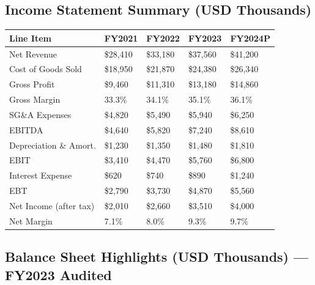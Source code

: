 \documentclass[11pt,a4paper]{article}
\begin{document}
\subsection{Income Statement Summary (USD Thousands)}

\renewcommand{\arraystretch}{1.35}
\begin{tabularx}{\textwidth}{@{} L{4.5cm} R{2.0cm} R{2.0cm} R{2.0cm} R{2.4cm} @{}}
  \toprule
  {\color{white}\bfseries\small Line Item} &
  {\color{white}\bfseries\small FY2021} &
  {\color{white}\bfseries\small FY2022} &
  {\color{white}\bfseries\small FY2023} &
  {\color{white}\bfseries\small FY2024P} \\
  \midrule
  Net Revenue                & \$28,410  & \$33,180  & \$37,560  & \$41,200  \\
  Cost of Goods Sold         & \$18,950  & \$21,870  & \$24,380  & \$26,340  \\
  Gross Profit               & \$9,460   & \$11,310  & \$13,180  & \$14,860  \\
  Gross Margin               & 33.3\%    & 34.1\%    & 35.1\%    & 36.1\%    \\
  SG\&A Expenses             & \$4,820   & \$5,490   & \$5,940   & \$6,250   \\
  EBITDA                     & \$4,640   & \$5,820   & \$7,240   & \$8,610   \\
  Depreciation \& Amort.     & \$1,230   & \$1,350   & \$1,480   & \$1,810   \\
  EBIT                       & \$3,410   & \$4,470   & \$5,760   & \$6,800   \\
  Interest Expense           & \$620     & \$740     & \$890     & \$1,240   \\
  EBT                        & \$2,790   & \$3,730   & \$4,870   & \$5,560   \\
  Net Income (after tax)     & \$2,010   & \$2,660   & \$3,510   & \$4,000   \\
  Net Margin                 & 7.1\%     & 8.0\%     & 9.3\%     & 9.7\%     \\
  \bottomrule
\end{tabularx}

\vspace{6pt}

\subsection{Balance Sheet Highlights (USD Thousands) — FY2023 Audited}
\end{document}
